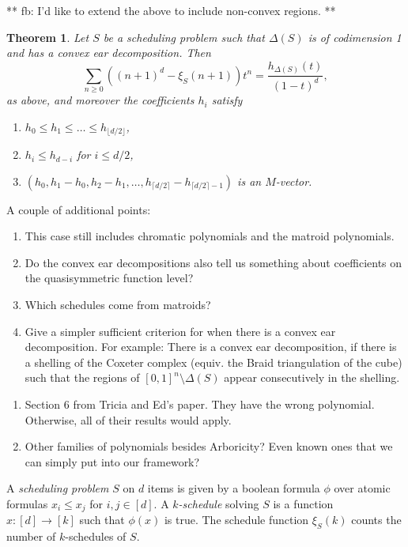 \documentclass[12pt,reqno]{amsart}
\numberwithin{definition}{section}
\newtheorem{theorem}[definition]{Theorem}
\newcommand{\defn}[1]{\emph{#1}}
\newcommand{\floor}[1]{\lfloor {#1} \rfloor}
\newcommand{\ceil}[1]{\lceil {#1} \rceil}
\begin{document}
** fb: I'd like to extend the above to include non-convex regions. **

\begin{theorem}
Let $S$ be a scheduling problem such that $\Delta(S)$ is of codimension 1 and has a convex ear decomposition. Then 
\[
  \sum_{n \geq 0} ((n+1)^d - \xi_S(n+1)) t^n = \frac{h_{\Delta(S)}(t)}{(1-t)^d},
\]
as above, and moreover the coefficients $h_i$ satisfy
\begin{enumerate}
\item $h_0 \leq h_1 \leq \ldots \leq h_{\floor{d/2}}$,
\item $h_i\leq h_{d-i}$ for $i\leq d/2$,
\item $(h_0,h_1-h_0,h_2-h_1,\ldots,h_{\ceil{d/2}}-h_{\ceil{d/2}-1})$ is an $M$-vector.
\end{enumerate}
\end{theorem}

A couple of additional points:
\begin{enumerate} 
\item This case still includes chromatic polynomials and the matroid polynomials.
\item Do the convex ear decompositions also tell us something about coefficients on the quasisymmetric function level?
\item Which schedules come from matroids? 
\item Give a simpler sufficient criterion for when there is a convex ear decomposition. For example: There is a convex ear decomposition, if there is a shelling of the Coxeter complex (equiv. the Braid triangulation of the cube) such that the regions of $[0,1]^n\setminus\Delta(S)$ appear consecutively in the shelling.
\end{enumerate}


\begin{enumerate}
\item Section 6 from Tricia and Ed's paper.  They have the wrong polynomial.  Otherwise, all of their results would apply.
\item Other families of polynomials besides Arboricity?  Even known ones that we can simply put into our framework?
\end{enumerate}


A \defn{scheduling problem} $S$ on $d$ items is given by a boolean
formula $\phi$ over atomic formulas $x_i\leq x_j$ for $i,j\in[d]$. A
\defn{$k$-schedule} solving $S$ is a function $x:[d]\rightarrow[k]$
such that $\phi(x)$ is true. The schedule function $\xi_S(k)$ counts
the number of $k$-schedules of $S$.
\end{document}
